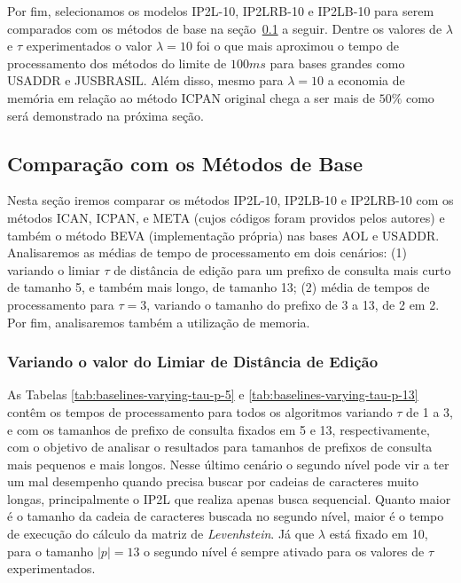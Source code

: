 Por fim, selecionamos os modelos IP2L-10, IP2LRB-10 e IP2LB-10 para serem comparados com os métodos de base na seção~\ref{sec:comparison_baseline_methods} a seguir. Dentre os valores de $\lambda$ e $\tau$ experimentados o valor $\lambda=10$ foi o que mais aproximou o tempo de processamento dos métodos do limite de $100ms$ para bases grandes como USADDR e JUSBRASIL. Além disso, mesmo para $\lambda=10$ a economia de memória em relação ao método ICPAN original chega a ser mais de $50\%$ como será demonstrado na próxima seção.


\subsection{Comparação com os Métodos de Base}
\label{sec:comparison_baseline_methods}

Nesta seção iremos comparar os métodos IP2L-10, IP2LB-10 e IP2LRB-10 com os métodos ICAN, ICPAN, e META (cujos códigos foram providos pelos autores) e também o método BEVA (implementação própria) nas bases AOL e USADDR. Analisaremos as médias de tempo de processamento em dois cenários: (1) variando o limiar $\tau$ de distância de edição para um prefixo de consulta mais curto de tamanho 5, e também mais longo, de tamanho 13; (2) média de tempos de processamento para $\tau=3$, variando o tamanho do prefixo de 3 a 13, de 2 em 2. Por fim, analisaremos também a utilização de memoria.

\subsubsection{Variando o valor do Limiar de Distância de Edição}

As Tabelas \ref{tab:baselines-varying-tau-p-5} e \ref{tab:baselines-varying-tau-p-13} contêm os tempos de processamento para todos os algoritmos variando $\tau$ de 1 a 3, e com os tamanhos de prefixo de consulta fixados em 5 e 13, respectivamente, com o objetivo de analisar o resultados para tamanhos de prefixos de consulta mais pequenos e mais longos. Nesse último cenário o segundo nível pode vir a ter um mal desempenho quando precisa buscar por cadeias de caracteres muito longas, principalmente o IP2L que realiza apenas busca sequencial. Quanto maior é o tamanho da cadeia de caracteres buscada no segundo nível, maior é o tempo de execução do cálculo da matriz de \textit{Levenhstein}. Já que $\lambda$ está fixado em 10, para o tamanho $|p|=13$ o segundo nível é sempre ativado para os valores de $\tau$ experimentados.

